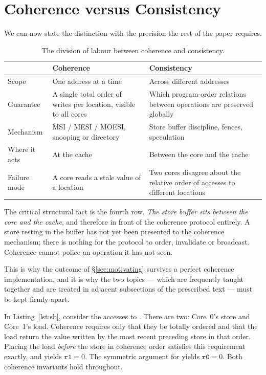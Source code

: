 \section{Coherence versus Consistency}
\label{sec:coh-vs-cons}

We can now state the distinction with the precision the rest of the paper
requires.

\begin{table}[H]
\centering
\small
\caption{The division of labour between coherence and consistency.}
\label{tab:coh-vs-cons}
\begin{tabular}{@{}p{3.4cm}p{5.2cm}p{5.2cm}@{}}
\toprule
 & \textbf{Coherence} & \textbf{Consistency} \\
\midrule
Scope        & One address at a time & Across different addresses \\
Guarantee    & A single total order of writes per location, visible to all cores
             & Which program-order relations between operations are preserved
               globally \\
Mechanism    & MSI / MESI / MOESI, snooping or directory
             & Store buffer discipline, fences, speculation \\
Where it acts & At the cache
             & Between the core and the cache \\
Failure mode & A core reads a stale value of a location
             & Two cores disagree about the relative order of accesses to
               different locations \\
\bottomrule
\end{tabular}
\end{table}

The critical structural fact is the fourth row.
\emph{The store buffer sits
between the core and the cache}, and therefore in front of the coherence
protocol entirely.
A store resting in the buffer has not yet been presented to
the coherence mechanism; there is nothing for the protocol to order, invalidate
or broadcast.
Coherence cannot police an operation it has not seen.

This is why the outcome of \S\ref{sec:motivating} survives a perfect coherence
implementation, and it is why the two topics --- which are frequently taught
together and are treated in adjacent subsections of the prescribed text --- must
be kept firmly apart.

\begin{example}
In Listing~\ref{lst:sb}, consider the accesses to .
There are two: Core~0's
store and Core~1's load.
Coherence requires only that they be totally ordered and
that the load return the value written by the most recent preceding store in that
order.
Placing the load \emph{before} the store in coherence order satisfies this
requirement exactly, and yields $\texttt{r1} = 0$. The symmetric argument for
 yields $\texttt{r0} = 0$. Both coherence invariants hold throughout.
\end{example}

